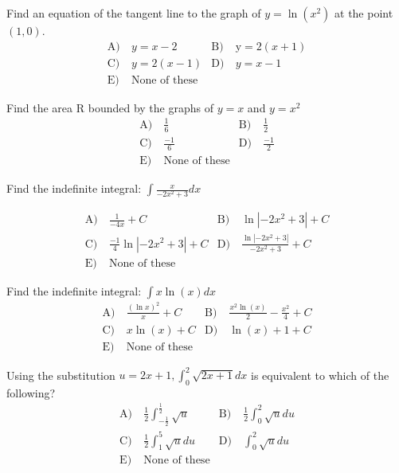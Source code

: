 \begin{problem}\label{PreCal-12}
Find an equation of the tangent line to the graph of $y=\ln \left(x^{2}\right)$ at the point $(1,0)$.
\begin{align*}
\text{A)}\ & y=x-2 &
\text{B)}\ & \mathrm{y}=2(x+1) \\
\text{C)}\ &  y=2(x-1) &
\text{D)}\ & y=x-1 \\
\text{E)}\ &  \text{None of these}&
\end{align*}    
\end{problem}


\begin{problem}\label{PreCal-13}
Find the area $\mathrm{R}$ bounded by the graphs of $y=x$ and $y=x^{2}$
\begin{align*}
\text{A)}\ & \frac{1}{6}  &
\text{B)}\ & \frac{1}{2} \\
\text{C)}\ & \frac{-1}{6}  &
\text{D)}\ & \frac{-1}{2}\\
\text{E)}\ &  \text{None of these}&
\end{align*}    
\end{problem}


\begin{problem}\label{PreCal-14}
Find the indefinite integral: $\int \frac{x}{-2 x^{2}+3} d x$

\begin{align*}
\text{A)}\ & \frac{1}{-4 x}+C &
\text{B)}\ &  \ln \left|-2 x^{2}+3\right|+C\\
\text{C)}\ & \frac{-1}{4} \ln \left|-2 x^{2}+3\right|+C  &
\text{D)}\ & \frac{\ln \left|-2 x^{2}+3\right|}{-2 x^{2}+3}+C\\
\text{E)}\ &  \text{None of these}&
\end{align*}    
\end{problem}


\begin{problem}\label{PreCal-15}
 Find the indefinite integral: $\int x \ln (x) d x$
\begin{align*}
\text{A)}\ & \frac{(\ln x)^{2}}{x}+C &
\text{B)}\ & \frac{x^{2} \ln (x)}{2}-\frac{x^{2}}{4}+C \\
\text{C)}\ & x \ln (x)+C  &
\text{D)}\ & \ln (x)+1+C\\
\text{E)}\ &  \text{None of these}&
\end{align*}    
\end{problem}


\begin{problem}\label{PreCal-16}
Using the substitution $u=2 x+1, \int_{0}^{2} \sqrt{2 x+1} d x$ is equivalent to which of the following?
\begin{align*}
\text{A)}\ & \frac{1}{2} \int_{-\frac{1}{2}}^{\frac{1}{2}} \sqrt{u} &
\text{B)}\ & \frac{1}{2} \int_{0}^{2} \sqrt{u} d u  \\
\text{C)}\ &  \frac{1}{2} \int_{1}^{5} \sqrt{u} d u &
\text{D)}\ & \int_{0}^{2} \sqrt{u} d u\\
\text{E)}\ &  \text{None of these}&
\end{align*}    
\end{problem}

